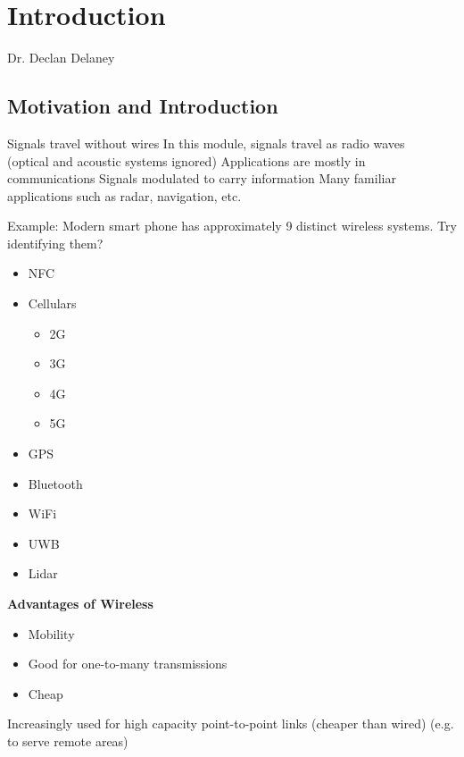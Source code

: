 \documentclass[12pt]{article}
\begin{document}
\tableofcontents

\begin{flushright}[Lecture on 1.2]\end{flushright}

\section{Introduction}
Dr. Declan Delaney

\subsection{Motivation and Introduction}
\begin{outline}[enumerate]
\1 Signals travel without wires
    \2 In this module, signals travel as radio waves\\
    (optical and acoustic systems ignored)
\1 Applications are mostly in communications
    \2 Signals modulated to carry information
    \2 Many familiar applications such as radar, navigation, etc.
\end{outline}

\begin{framed}
Example: Modern smart phone has approximately 9 distinct wireless systems. Try identifying them?


\begin{itemize}[noitemsep]
    \item NFC
    \item Cellulars
    \begin{itemize}[noitemsep]
        \item 2G
        \item 3G
        \item 4G
        \item 5G
    \end{itemize}
    \item GPS
    \item Bluetooth
    \item WiFi
    \item UWB
    \item Lidar
\end{itemize}
\end{framed}

\textbf{Advantages of Wireless}

\begin{itemize}[noitemsep]
    \item Mobility
    \item Good for one-to-many transmissions
    \item Cheap
\end{itemize}
Increasingly used for high capacity point-to-point links (cheaper than wired) (e.g. to serve remote areas)
\end{document}
